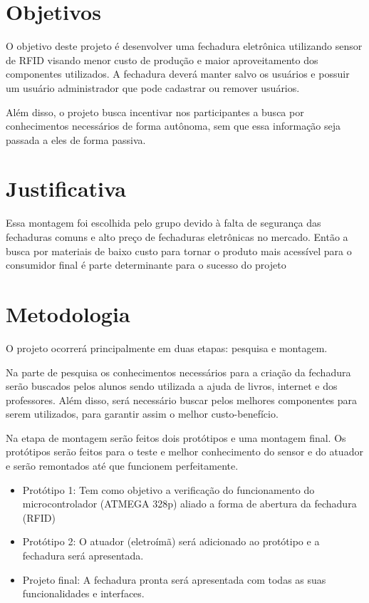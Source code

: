 \section{Objetivos}
O objetivo deste projeto é desenvolver uma fechadura
eletrônica utilizando sensor de RFID visando menor
custo de produção e maior aproveitamento dos componentes
utilizados. A fechadura deverá manter salvo os usuários e
possuir um usuário administrador que pode cadastrar ou remover usuários.

Além disso, o projeto busca incentivar nos participantes a busca por
conhecimentos necessários de forma autônoma, sem que essa informação seja passada a
eles de forma passiva. 

\section{Justificativa}
Essa montagem foi escolhida pelo grupo devido à falta de segurança das
fechaduras comuns e alto preço de fechaduras eletrônicas no mercado. Então a busca por
materiais de baixo custo para tornar o produto mais acessível para o consumidor final é
parte determinante para o sucesso do projeto

\section{Metodologia}
O projeto ocorrerá principalmente em duas etapas: pesquisa e montagem.

Na parte de pesquisa os conhecimentos necessários para a criação da fechadura
serão buscados pelos alunos sendo utilizada a ajuda de livros, internet e dos
professores. Além disso, será necessário buscar pelos melhores componentes para
serem utilizados, para garantir assim o melhor custo-benefício.

Na etapa de montagem serão feitos dois protótipos e uma montagem final. Os
protótipos serão feitos para o teste e melhor conhecimento do sensor e do 
atuador e serão remontados até que funcionem perfeitamente.

\begin{itemize}
\item Protótipo 1: Tem como objetivo a verificação do funcionamento do
microcontrolador (ATMEGA 328p) aliado a forma de abertura da
fechadura (RFID)

\item Protótipo 2: O atuador (eletroímã) será adicionado ao protótipo e a
fechadura será apresentada.

\item Projeto final: A fechadura pronta será apresentada com todas as suas
funcionalidades e interfaces.
\end{itemize}